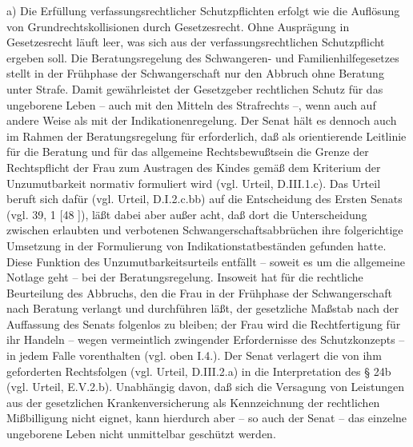 \documentclass[12pt]{article}
\begin{document}
\begin{sourcepara}[title={原文SondervotumMS.300}]
a) Die Erfüllung verfassungsrechtlicher Schutzpflichten erfolgt wie die Auflösung von Grundrechtskollisionen durch Gesetzesrecht. Ohne Ausprägung in Gesetzesrecht läuft leer, was sich aus der verfassungsrechtlichen Schutzpflicht ergeben soll. Die Beratungsregelung des Schwangeren- und Familienhilfegesetzes stellt in der Frühphase der Schwangerschaft nur den Abbruch ohne Beratung unter Strafe. Damit gewährleistet der Gesetzgeber rechtlichen Schutz für das ungeborene Leben -- auch mit den Mitteln des Strafrechts --, wenn auch auf andere Weise als mit der Indikationenregelung. Der Senat hält es dennoch auch im Rahmen der Beratungsregelung für erforderlich, daß als orientierende Leitlinie für die Beratung und für das allgemeine Rechtsbewußtsein die Grenze der Rechtspflicht der Frau zum Austragen des Kindes gemäß dem Kriterium der Unzumutbarkeit normativ formuliert wird (vgl. Urteil, D.III.1.c). Das Urteil beruft sich dafür (vgl. Urteil, D.I.2.c.bb) auf die Entscheidung des Ersten Senats (vgl. \abbrBVerfGE{} 39, 1 [48 \abbrFF{}]), läßt dabei aber außer acht, daß dort die Unterscheidung zwischen erlaubten und verbotenen Schwangerschaftsabbrüchen ihre folgerichtige Umsetzung in der Formulierung von Indikationstatbeständen gefunden hatte. Diese Funktion des Unzumutbarkeitsurteils entfällt -- soweit es um die allgemeine Notlage geht -- bei der Beratungsregelung. Insoweit hat für die rechtliche Beurteilung des Abbruchs, den die Frau in der Frühphase der Schwangerschaft nach Beratung verlangt und durchführen läßt, der gesetzliche Maßstab nach der Auffassung des Senats folgenlos zu bleiben; der Frau wird die Rechtfertigung für ihr Handeln -- wegen vermeintlich zwingender Erfordernisse des Schutzkonzepts -- in jedem Falle vorenthalten (vgl. oben I.4.). Der Senat verlagert die von ihm geforderten Rechtsfolgen (vgl. Urteil, D.III.2.a) in die Interpretation des § 24b \abbrSGBV{} (vgl. Urteil, E.V.2.b). Unabhängig davon, daß sich die Versagung von Leistungen aus der gesetzlichen Krankenversicherung als Kennzeichnung der rechtlichen Mißbilligung nicht eignet, kann hierdurch aber -- so auch der Senat -- das einzelne ungeborene Leben nicht unmittelbar geschützt werden.
\end{sourcepara}
\end{document}
